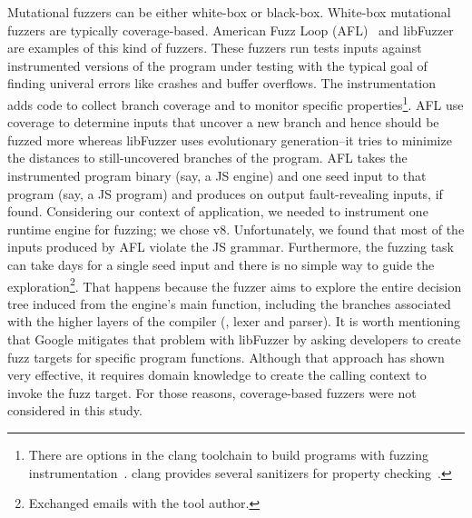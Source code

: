 \documentclass[10pt,conference,anonymous]{IEEEtran}
\begin{document}


Mutational fuzzers can be either white-box or black-box. White-box
mutational fuzzers are typically coverage-based. American Fuzz Loop
(AFL)~\cite{afl} and libFuzzer~\cite{libfuzzer} are examples of this
kind of fuzzers. These fuzzers run tests inputs against instrumented
versions of the program under testing with the typical goal of finding
univeral errors like crashes and buffer overflows. The instrumentation
adds code to collect branch coverage and to monitor specific
properties\footnote{There are options in the clang toolchain to build
  programs with fuzzing instrumentation~\cite{libfuzzer}. clang
  provides several sanitizers for property
  checking~\cite{clang-documentation}.}. AFL use coverage to determine
inputs that uncover a new branch and hence should be fuzzed more
whereas libFuzzer uses evolutionary generation--it tries to minimize
the distances to still-uncovered branches of the program. AFL takes
the instrumented program binary (say, a JS engine) and one seed input
to that program (say, a JS program) and produces on output
fault-revealing inputs, if found. Considering our context of
application, we needed to instrument one runtime engine for fuzzing;
we chose v8. Unfortunately, we found that most of the inputs produced
by AFL violate the JS grammar. Furthermore, the fuzzing task can take
days for a single seed input and there is no simple way to guide the
exploration\footnote{Exchanged emails with the tool author.}. That
happens because the fuzzer aims to explore the entire decision tree
induced from the engine's main function, including the branches
associated with the higher layers of the compiler (\eg{}, lexer and
parser). It is worth mentioning that Google mitigates that problem
with libFuzzer by asking developers to create fuzz targets for
specific program
functions\cite{libFuzzer-tutorial-google,libFuzzer-chromium-google}. Although
that approach has shown very effective, it requires domain knowledge
to create the calling context to invoke the fuzz target. For those
reasons, coverage-based fuzzers were not considered in this study.
\end{document}
